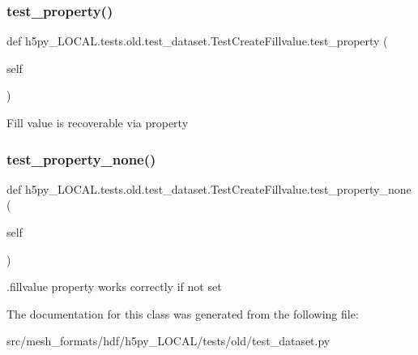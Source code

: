 \subsubsection{\texorpdfstring{test\+\_\+property()}{test\_property()}}
{\footnotesize\ttfamily def h5py\+\_\+\+L\+O\+C\+A\+L.\+tests.\+old.\+test\+\_\+dataset.\+Test\+Create\+Fillvalue.\+test\+\_\+property (\begin{DoxyParamCaption}\item[{}]{self }\end{DoxyParamCaption})}

\begin{DoxyVerb}Fill value is recoverable via property \end{DoxyVerb}
 \mbox{\label{classh5py__LOCAL_1_1tests_1_1old_1_1test__dataset_1_1TestCreateFillvalue_a085fdc8252ee9fa7d2961901dd303bd1}} 
\subsubsection{\texorpdfstring{test\+\_\+property\+\_\+none()}{test\_property\_none()}}
{\footnotesize\ttfamily def h5py\+\_\+\+L\+O\+C\+A\+L.\+tests.\+old.\+test\+\_\+dataset.\+Test\+Create\+Fillvalue.\+test\+\_\+property\+\_\+none (\begin{DoxyParamCaption}\item[{}]{self }\end{DoxyParamCaption})}

\begin{DoxyVerb}.fillvalue property works correctly if not set \end{DoxyVerb}
 

The documentation for this class was generated from the following file\+:\begin{DoxyCompactItemize}
\item 
src/mesh\+\_\+formats/hdf/h5py\+\_\+\+L\+O\+C\+A\+L/tests/old/test\+\_\+dataset.\+py\end{DoxyCompactItemize}
